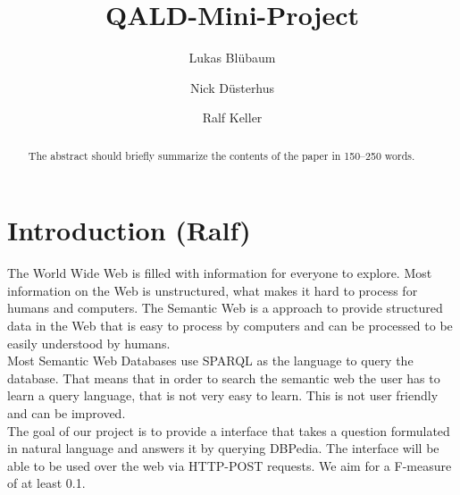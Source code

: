 \documentclass[runningheads]{llncs}
\begin{document}
%
\title{QALD-Mini-Project}
%
\newcommand\tab[1][1cm]{\hspace*{#1}}
\author{Lukas Bl{\"u}baum \and
Nick D{\"u}sterhus \and
Ralf Keller}
%
%



%
\maketitle              %
%
\begin{abstract}
The abstract should briefly summarize the contents of the paper in
150--250 words.

\end{abstract}
%
%
%
\section{Introduction (Ralf)}  

The World Wide Web is filled with information for everyone to explore. Most information on the Web is unstructured, what makes it hard to process for humans and computers. The Semantic Web is a approach to provide structured data in the Web that is easy to process by computers and can be processed to be easily understood by humans. \\

Most Semantic Web Databases use SPARQL as the language to query the database. That means that in order to search the semantic web the user has to learn a query language, that is not very easy to learn. This is not user friendly and can be improved. \\

The goal of our project is to provide a interface that takes a question formulated in natural language and answers it by querying DBPedia. The interface will be able to be used over the web via HTTP-POST requests. We aim for a F-measure of at least 0.1. \\
\end{document}
